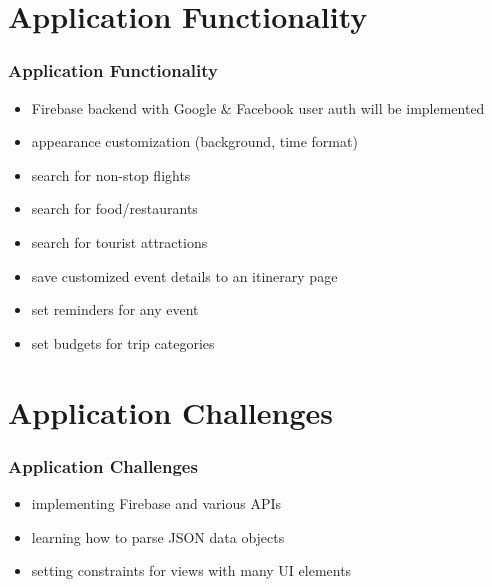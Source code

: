 \documentclass{beamer}
\begin{document}
\section{Application Functionality}
\begin{frame}
\frametitle{Application Functionality}
    \begin{itemize}
        \item Firebase backend with Google \& Facebook user auth will be implemented
        \item appearance customization (background, time format)
		\item search for non-stop flights
		\item search for food/restaurants
		\item search for tourist attractions
		\item save customized event details to an itinerary page
		\item set reminders for any event 
		\item set budgets for trip categories
    \end{itemize}
\end{frame}

\section{Application Challenges}
\begin{frame}
\frametitle{Application Challenges}
    \begin{itemize}
		\item implementing Firebase and various APIs
		\item learning how to parse JSON data objects
		\item setting constraints for views with many UI elements
    \end{itemize}
\end{frame}
\end{document}
